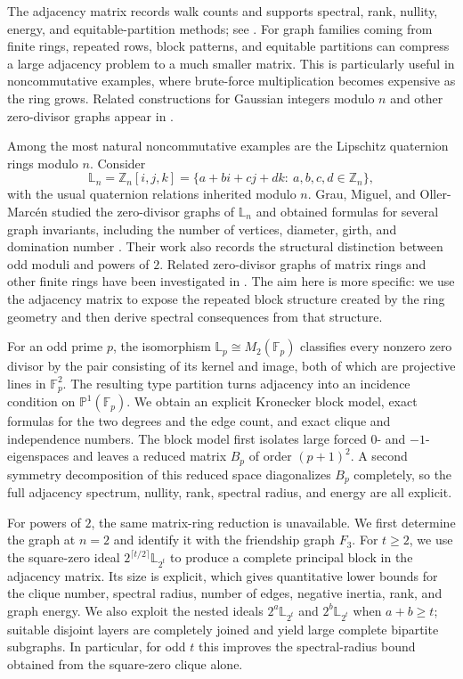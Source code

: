 \documentclass[12pt]{article}
\theoremstyle{definition}
\newcommand{\Z}{\mathbb{Z}}
\newcommand{\F}{\mathbb{F}}
\newcommand{\LL}{\mathbb{L}}
\newcommand{\PP}{\mathbb{P}}
\begin{document}
	The adjacency matrix records walk counts and supports spectral, rank, nullity, energy, and equitable-partition methods; see \cite{cvetkovic1995,godsil2001,brouwer2012,horn2013}.
	For graph families coming from finite rings, repeated rows, block patterns, and equitable partitions can compress a large adjacency problem to a much smaller matrix. This is particularly useful in noncommutative examples, where brute-force multiplication becomes expensive as the ring grows. Related constructions for Gaussian integers modulo $n$ and other zero-divisor graphs appear in \cite{abuosba2008,abuosba2011,bilal}.
	
	Among the most natural noncommutative examples are the Lipschitz quaternion rings modulo $n$. Consider
	$$
	\LL_n=\Z_n[i,j,k]
	=\{a+bi+cj+dk:\ a,b,c,d\in \Z_n\},
	$$
	with the usual quaternion relations inherited modulo $n$. Grau, Miguel, and Oller-Marc\'en studied the zero-divisor graphs of $\LL_n$ and obtained formulas for several graph invariants, including the number of vertices, diameter, girth, and domination number \cite{grau2017}. Their work also records the structural distinction between odd moduli and powers of $2$. Related zero-divisor graphs of matrix rings and other finite rings have been investigated in \cite{akbari2006,akbari2007,bozic2009,miguel2013,wu2005}. The aim here is more specific: we use the adjacency matrix to expose the repeated block structure created by the ring geometry and then derive spectral consequences from that structure.
	
	For an odd prime $p$, the isomorphism $\LL_p\cong M_2(\F_p)$ classifies every nonzero zero divisor by the pair consisting of its kernel and image, both of which are projective lines in $\F_p^2$. The resulting type partition turns adjacency into an incidence condition on $\PP^1(\F_p)$. We obtain an explicit Kronecker block model, exact formulas for the two degrees and the edge count, and exact clique and independence numbers. The block model first isolates large forced $0$- and $-1$-eigenspaces and leaves a reduced matrix $B_p$ of order $(p+1)^2$. A second symmetry decomposition of this reduced space diagonalizes $B_p$ completely, so the full adjacency spectrum, nullity, rank, spectral radius, and energy are all explicit.
	
	For powers of $2$, the same matrix-ring reduction is unavailable. We first determine the graph at $n=2$ and identify it with the friendship graph $F_3$. For $t\ge2$, we use the square-zero ideal $2^{\lceil t/2\rceil}\LL_{2^t}$ to produce a complete principal block in the adjacency matrix. Its size is explicit, which gives quantitative lower bounds for the clique number, spectral radius, number of edges, negative inertia, rank, and graph energy. We also exploit the nested ideals $2^a\LL_{2^t}$ and $2^b\LL_{2^t}$ when $a+b\ge t$; suitable disjoint layers are completely joined and yield large complete bipartite subgraphs. In particular, for odd $t$ this improves the spectral-radius bound obtained from the square-zero clique alone.
	
\end{document}
